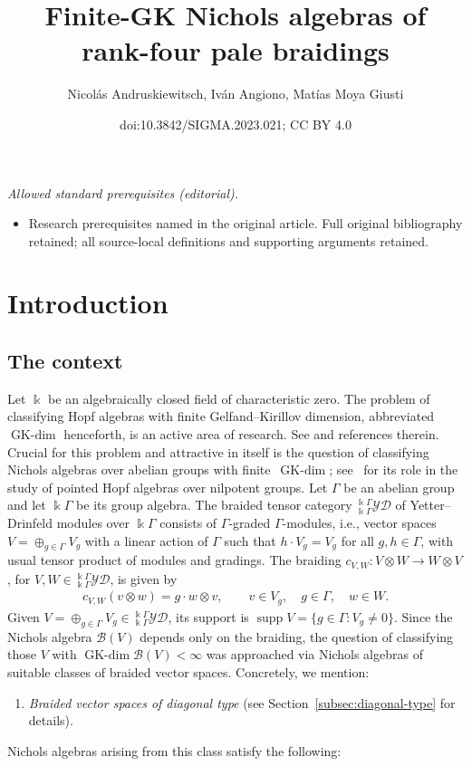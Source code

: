 \documentclass[10pt,a4paper]{amsart}
\title{Finite-GK Nichols algebras of rank-four pale braidings}
\author{Nicolás Andruskiewitsch, Iván Angiono, Matías Moya Giusti}
\date{doi:10.3842/SIGMA.2023.021; CC BY 4.0}
\numberwithin{equation}{section}
\newcommand{\GK}{\operatorname{GK-dim}}
\newcommand{\supp}{\operatorname{supp}}
\newcommand{\toba}{\mathscr B}
\newcommand{\yd}[1]{{}_{#1}^{#1}\mathcal{YD}}
\begin{document}
\maketitle
\noindent\textit{Allowed standard prerequisites (editorial).}\begin{itemize}
\item Research prerequisites named in the original article. Full original bibliography retained; all source-local definitions and supporting arguments retained.
\end{itemize}\medskip
\section{Introduction}
\subsection{The context}
Let $\Bbbk$ be an algebraically closed field of characteristic zero.
The problem of classifying Hopf algebras with finite Gelfand--Kirillov dimension, abbreviated $\GK$ henceforth,
is an active area of research. See \cite{AAH-triang,ASa-preNichols,angiono-campagnolo-sanmarco,brown-zhang}
and references therein.
Crucial for this problem and attractive in itself is the question of classifying Nichols algebras over abelian groups with finite~$\GK$; see~\cite{A-nilpotent} for its role in the study of pointed Hopf algebras over nilpotent groups.
Let $\Gamma$ be an abelian group and let $\Bbbk \Gamma$ be its group algebra.
The braided tensor category $\yd{\Bbbk\Gamma}$ of Yetter--Drinfeld modules over $\Bbbk \Gamma$
consists of $\Gamma$-graded $\Gamma$-modules, i.e., vector spaces $V = \oplus_{g \in \Gamma} V_g$
with a linear action of $\Gamma$ such that $h \cdot V_g = V_g$ for all $g,h\in \Gamma$, with usual tensor product of modules and gradings.
The braiding $c_{V,W}\colon V \otimes W \to W \otimes V$, for $V, W\in \yd{\Bbbk\Gamma}$, is given by
\begin{gather}\label{eq:braiding-ydG}
c_{V,W} (v \otimes w) = g\cdot w \otimes v, \qquad
v\in V_g, \quad g \in \Gamma, \quad w\in W.
\end{gather}
Given $V = \oplus_{g \in \Gamma} V_g \in\yd{\Bbbk\Gamma}$, its support is
$\supp V = \{g\in \Gamma\colon V_g \neq 0 \}$.
Since the Nichols algebra $\toba(V)$ depends only on the braiding, the question of classifying those $V$ with $\GK \toba(V) < \infty$
was approached via Nichols algebras of suitable classes of braided vector spaces. Concretely, we mention:
\begin{enumerate}[label=$(\alph*)$]\itemsep=0pt
\item\label{item:diagonal}
\emph{Braided vector spaces of diagonal type} (see Section~\ref{subsec:diagonal-type} for details).
\end{enumerate}
Nichols algebras arising from this class satisfy the following:
\end{document}
